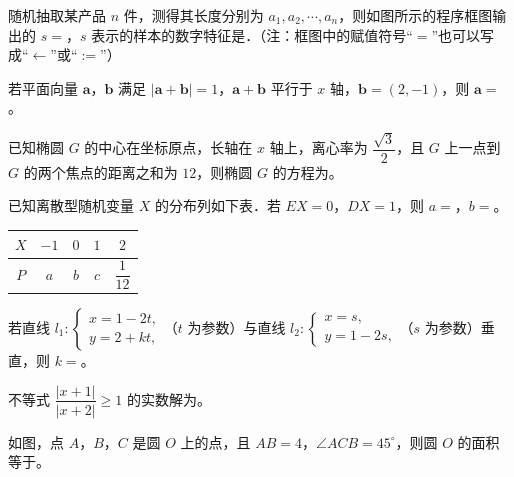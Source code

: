 \Needspace{0.4\textheight}
\begingroup
\renewenvironment{question}{\Needspace{0.5\textheight}}{}
\begin{question}
随机抽取某产品 $n$ 件，测得其长度分别为 $a_1,a_2,\cdots,a_n$，则如图所示的程序框图输出的 $s=$\gkblank{}，$s$ 表示的样本的数字特征是\gkblank{}．（注：框图中的赋值符号“$=$”也可以写成“$\leftarrow$”或“$:=$”）
\nopagebreak[4]
\begin{center}\end{center}
\nopagebreak[4]
\end{question}
\endgroup
\begin{question}
若平面向量 $\boldsymbol a$，$\boldsymbol b$ 满足 $|\boldsymbol a+\boldsymbol b|=1$，$\boldsymbol a+\boldsymbol b$ 平行于 $x$ 轴，$\boldsymbol b=(2,-1)$，则 $\boldsymbol a=$\gkblank{}。

\end{question}
\begin{question}
已知椭圆 $G$ 的中心在坐标原点，长轴在 $x$ 轴上，离心率为 $\dfrac{\sqrt3}{2}$，且 $G$ 上一点到 $G$ 的两个焦点的距离之和为 $12$，则椭圆 $G$ 的方程为\gkblank{}。

\end{question}
\begin{question}
已知离散型随机变量 $X$ 的分布列如下表．若 $EX=0$，$DX=1$，则 $a=$\gkblank{}，$b=$\gkblank{}。

\begin{center}
\begin{tabular}{ccccc}
\toprule
$X$ & $-1$ & $0$ & $1$ & $2$ \\
\midrule
$P$ & $a$ & $b$ & $c$ & $\dfrac{1}{12}$ \\
\bottomrule
\end{tabular}
\end{center}

\end{question}
\begin{question}
若直线 $l_1:\begin{cases}x=1-2t,\\ y=2+kt,\end{cases}$（$t$ 为参数）与直线 $l_2:\begin{cases}x=s,\\ y=1-2s,\end{cases}$（$s$ 为参数）垂直，则 $k=$\gkblank{}。

\end{question}
\begin{question}
不等式 $\dfrac{|x+1|}{|x+2|}\geqslant1$ 的实数解为\gkblank{}。

\Needspace{0.4\textheight}
\end{question}
\begingroup
\renewenvironment{question}{\Needspace{0.4\textheight}}{}
\begin{question}
如图，点 $A$，$B$，$C$ 是圆 $O$ 上的点，且 $AB=4$，$\angle ACB=45^\circ$，则圆 $O$ 的面积等于\gkblank{}。
\nopagebreak[4]
\begin{center}\end{center}
\nopagebreak[4]
\end{question}
\endgroup
{}

